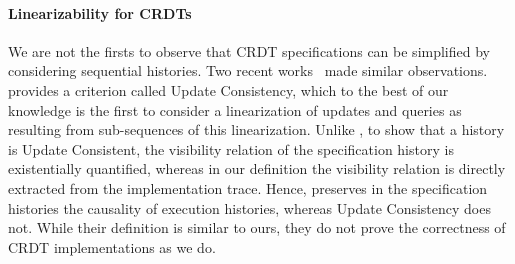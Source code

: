 \paragraph{Linearizability for CRDTs}
We are not the firsts to observe that CRDT specifications can be
simplified by considering sequential histories.
%
Two recent works~\cite{PerrinMJ14, JagadeesanR18} made similar
observations.
%
\citet{PerrinMJ14} provides a criterion called Update Consistency,
which to the best of our knowledge is the first to consider a
linearization of updates and queries as resulting from sub-sequences
of this linearization.
%
Unlike \CRDTLinshort{}, to show that a history is Update Consistent,
the visibility relation of the specification history is existentially
quantified, whereas in our definition the visibility relation is
directly extracted from the implementation trace.
%
Hence, \CRDTLinshort{} preserves in the specification histories the
causality of execution histories, whereas Update Consistency does not.
%
While their definition is similar to ours, they do not prove the
correctness of CRDT implementations as we do.


